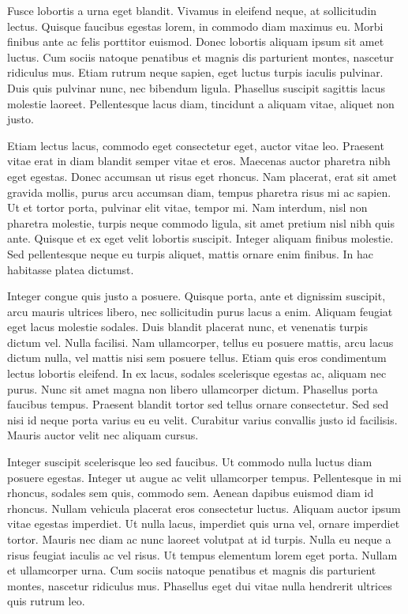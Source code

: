 \documentclass[a4paper]{article}
\begin{document}
Fusce lobortis a urna eget blandit. Vivamus in eleifend neque, at sollicitudin lectus. Quisque faucibus egestas lorem, in commodo diam maximus eu. Morbi finibus ante ac felis porttitor euismod. Donec lobortis aliquam ipsum sit amet luctus. Cum sociis natoque penatibus et magnis dis parturient montes, nascetur ridiculus mus. Etiam rutrum neque sapien, eget luctus turpis iaculis pulvinar. Duis quis pulvinar nunc, nec bibendum ligula. Phasellus suscipit sagittis lacus molestie laoreet. Pellentesque lacus diam, tincidunt a aliquam vitae, aliquet non justo.

Etiam lectus lacus, commodo eget consectetur eget, auctor vitae leo. Praesent vitae erat in diam blandit semper vitae et eros. Maecenas auctor pharetra nibh eget egestas. Donec accumsan ut risus eget rhoncus. Nam placerat, erat sit amet gravida mollis, purus arcu accumsan diam, tempus pharetra risus mi ac sapien. Ut et tortor porta, pulvinar elit vitae, tempor mi. Nam interdum, nisl non pharetra molestie, turpis neque commodo ligula, sit amet pretium nisl nibh quis ante. Quisque et ex eget velit lobortis suscipit. Integer aliquam finibus molestie. Sed pellentesque neque eu turpis aliquet, mattis ornare enim finibus. In hac habitasse platea dictumst.

Integer congue quis justo a posuere. Quisque porta, ante et dignissim suscipit, arcu mauris ultrices libero, nec sollicitudin purus lacus a enim. Aliquam feugiat eget lacus molestie sodales. Duis blandit placerat nunc, et venenatis turpis dictum vel. Nulla facilisi. Nam ullamcorper, tellus eu posuere mattis, arcu lacus dictum nulla, vel mattis nisi sem posuere tellus. Etiam quis eros condimentum lectus lobortis eleifend. In ex lacus, sodales scelerisque egestas ac, aliquam nec purus. Nunc sit amet magna non libero ullamcorper dictum. Phasellus porta faucibus tempus. Praesent blandit tortor sed tellus ornare consectetur. Sed sed nisi id neque porta varius eu eu velit. Curabitur varius convallis justo id facilisis. Mauris auctor velit nec aliquam cursus.

Integer suscipit scelerisque leo sed faucibus. Ut commodo nulla luctus diam posuere egestas. Integer ut augue ac velit ullamcorper tempus. Pellentesque in mi rhoncus, sodales sem quis, commodo sem. Aenean dapibus euismod diam id rhoncus. Nullam vehicula placerat eros consectetur luctus. Aliquam auctor ipsum vitae egestas imperdiet. Ut nulla lacus, imperdiet quis urna vel, ornare imperdiet tortor. Mauris nec diam ac nunc laoreet volutpat at id turpis. Nulla eu neque a risus feugiat iaculis ac vel risus. Ut tempus elementum lorem eget porta. Nullam et ullamcorper urna. Cum sociis natoque penatibus et magnis dis parturient montes, nascetur ridiculus mus. Phasellus eget dui vitae nulla hendrerit ultrices quis rutrum leo.
\end{document}
